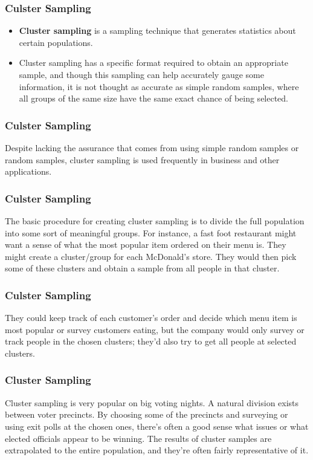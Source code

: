 \documentclass{beamer}
\begin{document}
\begin{frame}

\end{frame}
\begin{frame}
\frametitle{Culster Sampling}
\Large
\begin{itemize}
\item \textbf{Cluster sampling} is a sampling technique that generates statistics about certain populations. 
\item Cluster sampling has a specific format required to obtain an appropriate sample, and though this sampling can help accurately gauge some information, it is not thought as accurate as simple random samples, where all groups of the same size have the same exact chance of being selected.
\end{itemize}
\end{frame}
\begin{frame}
\frametitle{Culster Sampling}
\Large
 Despite lacking the assurance that comes from using simple random samples or random samples, cluster sampling is used frequently in business and other applications. 
\end{frame}
\begin{frame}
\frametitle{Culster Sampling}
\Large
The basic procedure for creating cluster sampling is to divide the full population into some sort of meaningful groups. For instance, a fast foot restaurant might want a sense of what the most popular item ordered on their menu is. They might create a cluster/group for each McDonald’s store. They would then pick some of these clusters and obtain a sample from all people in that cluster. \end{frame}
\begin{frame}
\frametitle{Culster Sampling}
\Large They could keep track of each customer’s order and decide which menu item is most popular or survey customers eating, but the company would only survey or track people in the chosen clusters; they’d also try to get all people at selected clusters. 
\end{frame}
\begin{frame}
\frametitle{Cluster Sampling}
\Large
Cluster sampling is very popular on big voting nights. A natural division exists between voter precincts. By choosing some of the precincts and surveying or using exit polls at the chosen ones, there’s often a good sense what issues or what elected officials appear to be winning. The results of cluster samples are extrapolated to the entire population, and they’re often fairly representative of it. 
\end{frame}
\end{document}
